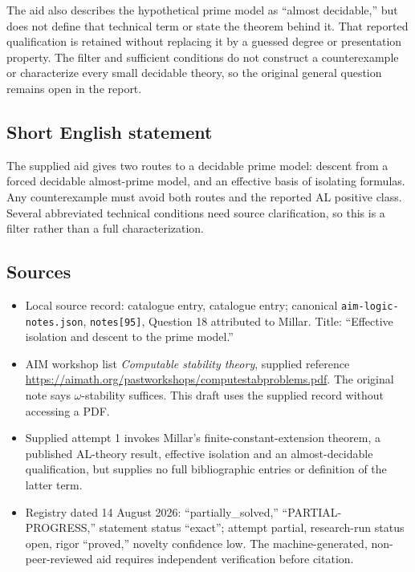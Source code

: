 \documentclass[11pt]{article}
\begin{document}
The aid also describes the hypothetical prime model as ``almost decidable,'' but does not define that technical term or state the theorem behind it. That reported qualification is retained without replacing it by a guessed degree or presentation property. The filter and sufficient conditions do not construct a counterexample or characterize every small decidable theory, so the original general question remains open in the report.
\subsection{Short English statement}
The supplied aid gives two routes to a decidable prime model: descent from a forced decidable almost-prime model, and an effective basis of isolating formulas. Any counterexample must avoid both routes and the reported AL positive class. Several abbreviated technical conditions need source clarification, so this is a filter rather than a full characterization.
\subsection{Sources}
\begin{itemize}
\item Local source record: catalogue entry, catalogue entry; canonical \texttt{aim-logic-notes.json}, \texttt{notes[95]}, Question 18 attributed to Millar. Title: ``Effective isolation and descent to the prime model.''
\item AIM workshop list \emph{Computable stability theory}, supplied reference \url{https://aimath.org/pastworkshops/computestabproblems.pdf}. The original note says \(\omega\)-stability suffices. This draft uses the supplied record without accessing a PDF.
\item Supplied attempt 1 invokes Millar's finite-constant-extension theorem, a published AL-theory result, effective isolation and an almost-decidable qualification, but supplies no full bibliographic entries or definition of the latter term.
\item Registry dated 14 August 2026: ``partially\_solved,'' ``PARTIAL-PROGRESS,'' statement status ``exact''; attempt partial, research-run status open, rigor ``proved,'' novelty confidence low. The machine-generated, non-peer-reviewed aid requires independent verification before citation.
\end{itemize}
\end{document}
